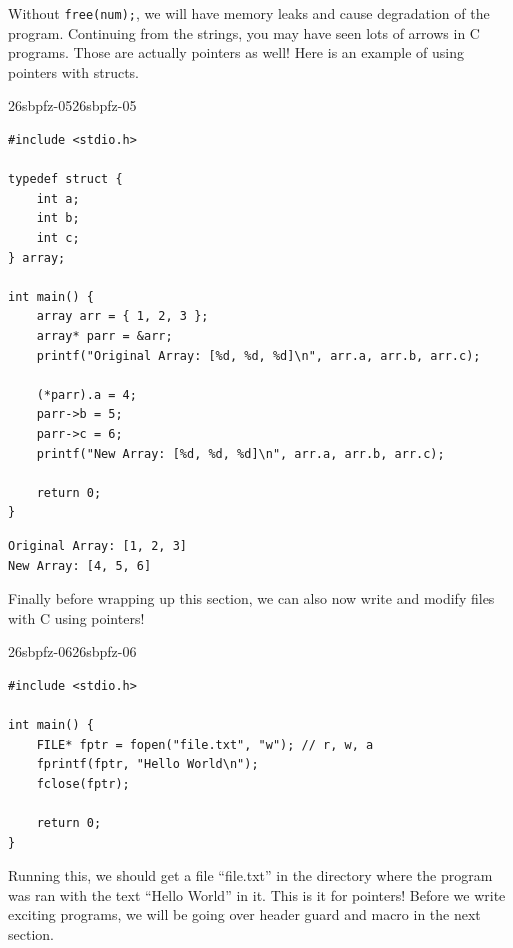\documentclass[../../../main.tex]{subfiles}
\begin{document}
Without \verb|free(num);|, we will have memory leaks and cause
degradation of the program. Continuing from the strings, you may have
seen lots of arrows in C programs. Those are actually pointers as
well! Here is an example of using pointers with structs.

\begin{cbox}{26sbpfz-05}{26sbpfz-05}
\begin{lstlisting}[style=cstyle]
#include <stdio.h>

typedef struct {
    int a;
    int b;
    int c;
} array;

int main() {
    array arr = { 1, 2, 3 };
    array* parr = &arr;
    printf("Original Array: [%d, %d, %d]\n", arr.a, arr.b, arr.c);

    (*parr).a = 4;
    parr->b = 5;
    parr->c = 6;
    printf("New Array: [%d, %d, %d]\n", arr.a, arr.b, arr.c);

    return 0;
}
\end{lstlisting}
\end{cbox}
\begin{outputbox}
\begin{lstlisting}[style=basic]
Original Array: [1, 2, 3]
New Array: [4, 5, 6]
\end{lstlisting}
\end{outputbox}

Finally before wrapping up this section, we can also now write and
modify files with C using pointers!

\begin{cbox}{26sbpfz-06}{26sbpfz-06}
\begin{lstlisting}[style=cstyle]
#include <stdio.h>

int main() {
    FILE* fptr = fopen("file.txt", "w"); // r, w, a
    fprintf(fptr, "Hello World\n");
    fclose(fptr);

    return 0;
}
\end{lstlisting}
\end{cbox}

Running this, we should get a file ``file.txt'' in the directory where
the program was ran with the text ``Hello World'' in it. This is it
for pointers! Before we write exciting programs, we will be going
over header guard and macro in the next section.
\end{document}
